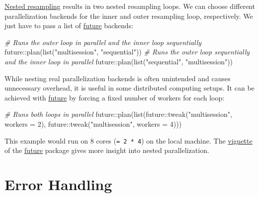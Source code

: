 \documentclass[
]{scrbook}
\newenvironment{Shaded}{\begin{snugshade}}{\end{snugshade}}
\newcommand{\AttributeTok}[1]{\textcolor[rgb]{0.77,0.63,0.00}{#1}}
\newcommand{\CommentTok}[1]{\textcolor[rgb]{0.56,0.35,0.01}{\textit{#1}}}
\newcommand{\DecValTok}[1]{\textcolor[rgb]{0.00,0.00,0.81}{#1}}
\newcommand{\FunctionTok}[1]{\textcolor[rgb]{0.00,0.00,0.00}{#1}}
\newcommand{\NormalTok}[1]{#1}
\newcommand{\SpecialCharTok}[1]{\textcolor[rgb]{0.00,0.00,0.00}{#1}}
\newcommand{\StringTok}[1]{\textcolor[rgb]{0.31,0.60,0.02}{#1}}
\renewenvironment{Shaded} {\begin{snugshade}\small} {\end{snugshade}}
\begin{document}
\protect\hyperlink{nested-resampling}{Nested resampling} results in two nested resampling loops.
We can choose different parallelization backends for the inner and outer resampling loop, respectively.
We just have to pass a list of \href{https://cran.r-project.org/package=future}{future} backends:

\begin{Shaded}
\begin{Highlighting}[]
\CommentTok{\# Runs the outer loop in parallel and the inner loop sequentially}
\NormalTok{future}\SpecialCharTok{::}\FunctionTok{plan}\NormalTok{(}\FunctionTok{list}\NormalTok{(}\StringTok{"multisession"}\NormalTok{, }\StringTok{"sequential"}\NormalTok{))}
\CommentTok{\# Runs the outer loop sequentially and the inner loop in parallel}
\NormalTok{future}\SpecialCharTok{::}\FunctionTok{plan}\NormalTok{(}\FunctionTok{list}\NormalTok{(}\StringTok{"sequential"}\NormalTok{, }\StringTok{"multisession"}\NormalTok{))}
\end{Highlighting}
\end{Shaded}

While nesting real parallelization backends is often unintended and causes unnecessary overhead, it is useful in some distributed computing setups.
It can be achieved with \href{https://cran.r-project.org/package=future}{future} by forcing a fixed number of workers for each loop:

\begin{Shaded}
\begin{Highlighting}[]
\CommentTok{\# Runs both loops in parallel}
\NormalTok{future}\SpecialCharTok{::}\FunctionTok{plan}\NormalTok{(}\FunctionTok{list}\NormalTok{(future}\SpecialCharTok{::}\FunctionTok{tweak}\NormalTok{(}\StringTok{"multisession"}\NormalTok{, }\AttributeTok{workers =} \DecValTok{2}\NormalTok{),}
\NormalTok{                  future}\SpecialCharTok{::}\FunctionTok{tweak}\NormalTok{(}\StringTok{"multisession"}\NormalTok{, }\AttributeTok{workers =} \DecValTok{4}\NormalTok{)))}
\end{Highlighting}
\end{Shaded}

This example would run on 8 cores (\texttt{=\ 2\ *\ 4}) on the local machine.
The \href{https://cran.r-project.org/web/packages/future/vignettes/future-3-topologies.html}{vignette} of the \href{https://cran.r-project.org/package=future}{future} package gives more insight into nested parallelization.

\hypertarget{error-handling}{%
\section{Error Handling}\label{error-handling}}
\end{document}
